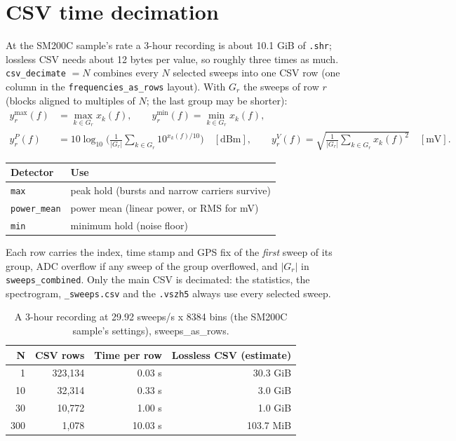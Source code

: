 \documentclass[11pt,a4paper]{article}
\newcommand{\code}[1]{\texttt{#1}}
\begin{document}
\section{CSV time decimation}\label{sec:decimate}
At the SM200C sample's rate a 3-hour recording is about 10.1 GiB of \code{.shr};
lossless CSV needs about 12 bytes per value, so roughly three times as much. \code{csv\_decimate} $=N$
combines every $N$ selected sweeps into one CSV row (one column in the \code{frequencies\_as\_rows} layout).
With $G_r$ the sweeps of row $r$ (blocks aligned to multiples of $N$; the last group may be shorter):
\begin{align}
y^{\max}_r(f)&=\max_{k\in G_r}x_k(f), \qquad y^{\min}_r(f)=\min_{k\in G_r}x_k(f),\\
y^{P}_r(f)&=10\log_{10}\Big(\frac{1}{|G_r|}\sum_{k\in G_r}10^{x_k(f)/10}\Big)\quad[\mathrm{dBm}],
\qquad y^{V}_r(f)=\sqrt{\frac{1}{|G_r|}\sum_{k\in G_r}x_k(f)^2}\quad[\mathrm{mV}].
\end{align}
\begin{longtable}{lp{10cm}}
\toprule
\textbf{Detector} & \textbf{Use}\\
\midrule
\endhead
\texttt{max} & peak hold (bursts and narrow carriers survive)\\
\texttt{power\_\allowbreak{}mean} & power mean (linear power, or RMS for mV)\\
\texttt{min} & minimum hold (noise floor)\\
\bottomrule
\end{longtable}
Each row carries the index, time stamp and GPS fix of the \emph{first} sweep of its group, ADC overflow if any
sweep of the group overflowed, and $|G_r|$ in \code{sweeps\_combined}. Only the main CSV is decimated: the
statistics, the spectrogram, \code{\_sweeps.csv} and the \code{.vszh5} always use every selected sweep.
\begin{longtable}{rrrr}
\caption{A 3-hour recording at 29.92 sweeps/s x 8384 bins (the SM200C sample's settings), sweeps\_as\_rows.}\\
\toprule
\textbf{N} & \textbf{CSV rows} & \textbf{Time per row} & \textbf{Lossless CSV (estimate)}\\
\midrule
\endhead
1 & 323,134 & 0.03 s & 30.3 GiB\\
10 & 32,314 & 0.33 s & 3.0 GiB\\
30 & 10,772 & 1.00 s & 1.0 GiB\\
300 & 1,078 & 10.03 s & 103.7 MiB\\
\bottomrule
\end{longtable}
\end{document}
